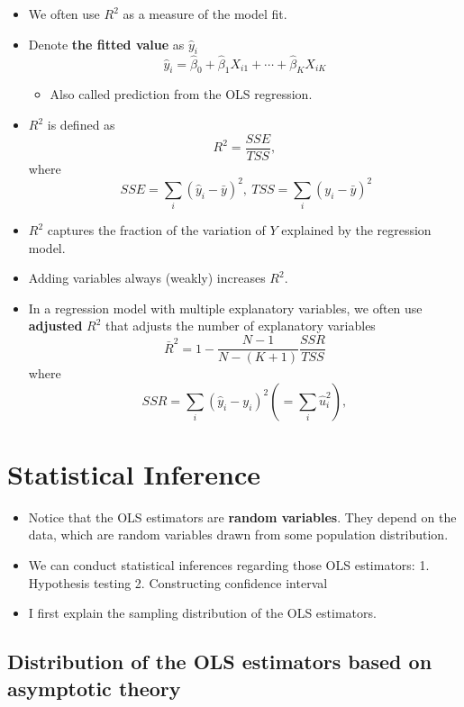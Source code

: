 \documentclass[]{book}
\providecommand{\tightlist}{%
  \setlength{\itemsep}{0pt}\setlength{\parskip}{0pt}}
\begin{document}
\begin{itemize}
\tightlist
\item
  We often use \(R^2\) as a measure of the model fit.
\item
  Denote \textbf{the fitted value} as \(\hat{y}_i\) \[
   \hat{y}_i = \hat{\beta}_0 + \hat{\beta}_1 X_{i1} + \cdots + \hat{\beta}_K X_{iK}
  \]

  \begin{itemize}
  \tightlist
  \item
    Also called prediction from the OLS regression.
  \end{itemize}
\item
  \(R^2\) is defined as \[
  R^2 = \frac{SSE}{TSS},
  \] where \[ 
   \  SSE = \sum_i (\hat{y}_i - \bar{y})^2, \ TSS = \sum_i (y_i - \bar{y})^2
  \]
\item
  \(R^2\) captures the fraction of the variation of \(Y\) explained by
  the regression model.
\item
  Adding variables always (weakly) increases \(R^2\).
\item
  In a regression model with multiple explanatory variables, we often
  use \textbf{adjusted} \(R^2\) that adjusts the number of explanatory
  variables \[
  \bar{R}^2 = 1 - \frac{N-1}{N-(K+1)} \frac{SSR}{TSS}
  \] where \[
  SSR = \sum_i (\hat{y}_i - y_i)^2 (= \sum_i \hat{u}_i^2 ),
  \]
\end{itemize}

\section{Statistical Inference}\label{statistical-inference}

\begin{itemize}
\tightlist
\item
  Notice that the OLS estimators are \textbf{random variables}. They
  depend on the data, which are random variables drawn from some
  population distribution.
\item
  We can conduct statistical inferences regarding those OLS estimators:
  1. Hypothesis testing 2. Constructing confidence interval
\item
  I first explain the sampling distribution of the OLS estimators.
\end{itemize}

\subsection{Distribution of the OLS estimators based on asymptotic
theory}\label{distribution-of-the-ols-estimators-based-on-asymptotic-theory}
\end{document}
